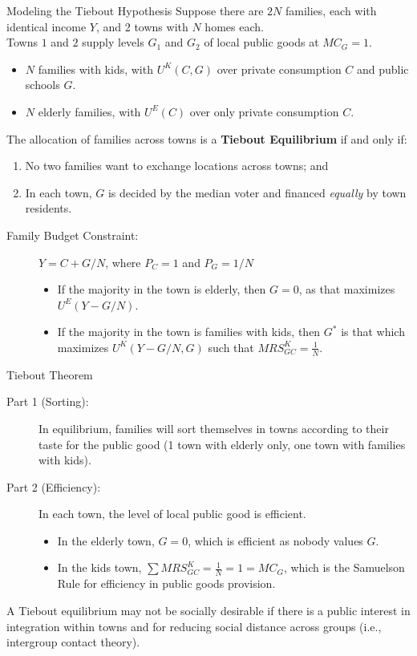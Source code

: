 \documentclass[10pt]{extarticle}
\begin{document}
  \begin{problem}{Modeling the Tiebout Hypothesis}
    Suppose there are $2N$ families, each with identical income $Y$, and 2 towns with $N$ homes each.\\

    Towns $1$ and $2$ supply levels $G_1$ and $G_2$ of local public goods at $MC_G = 1$.
    \begin{itemize}
      \item $N$ families with kids, with $U^K(C,G)$ over private consumption $C$ and public schools $G$.
      \item $N$ elderly families, with $U^E(C)$ over only private consumption $C$.
    \end{itemize}
    The allocation of families across towns is a \textbf{Tiebout Equilibrium} if and only if:
    \begin{enumerate}[(1)]
      \item No two families want to exchange locations across towns; and
      \item In each town, $G$ is decided by the median voter and financed \textit{equally} by town residents.
    \end{enumerate}
    \begin{description}
      \item[Family Budget Constraint:] $Y = C + G/N$, where $P_C = 1$ and $P_G = 1/N$
        \begin{itemize}
          \item If the majority in the town is elderly, then $G = 0$, as that maximizes $U^E(Y-G/N)$. 
          \item If the majority in the town is families with kids, then $G^*$ is that which maximizes $U^K(Y-G/N,G)$ such that $MRS_{GC}^K = \frac{1}{N}$.
        \end{itemize}
    \end{description}
    \begin{problem}{Tiebout Theorem}
      \begin{description}
        \item[Part 1 (Sorting):] In equilibrium, families will sort themselves in towns according to their taste for the public good (1 town with elderly only, one town with families with kids).
        \item[Part 2 (Efficiency):] In each town, the level of local public good is efficient.
          \begin{itemize}
            \item In the elderly town, $G = 0$, which is efficient as nobody values $G$.
            \item In the kids town, $\sum MRS_{GC}^{K} = \frac{1}{N} = 1 = MC_G$, which is the Samuelson Rule for efficiency in public goods provision.
          \end{itemize}
      \end{description}
    \end{problem}
    A Tiebout equilibrium may not be socially desirable if there is a public interest in integration within towns and for reducing social distance across groups (i.e., intergroup contact theory).
  \end{problem}
\end{document}
